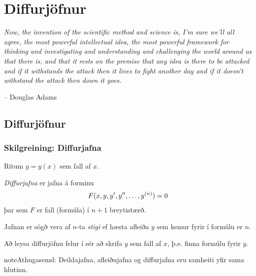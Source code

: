 \documentclass[b5paper,10pt,icelandic]{sphinxmanual}
\begin{document}
\chapter{Diffurjöfnur}
\label{kafli08:diffurjofnur}\label{kafli08::doc}
\emph{Now, the invention of the scientific method and science is, I'm sure
we'll all agree, the most powerful intellectual idea, the most powerful
framework for thinking and investigating and understanding and challenging
the world around us that there is, and that it rests on the premise that
any idea is there to be attacked and if it withstands the attack then it
lives to fight another day and if it doesn't withstand the attack then
down it goes.}

-- Douglas Adams


\section{Diffurjöfnur}
\label{kafli08:id1}\label{kafli08:index-0}

\subsection{Skilgreining: Diffurjafna}
\label{kafli08:skilgreining-diffurjafna}\label{kafli08:diffurjafna}
Ritum \(y=y(x)\) sem fall af \(x\).

\textit{Diffurjafna} er jafna á forminu
\begin{gather}
\begin{split}F(x, y, y', y'', \ldots, y^{(n)})=0\end{split}\notag
\end{gather}
þar sem \(F\) er fall (formúla) í \(n+1\) breytistærð.

Jafnan er sögð vera af \(n\)-ta \emph{stigi} ef hæsta afleiða \(y\)
sem kemur fyrir í formúlu er \(n\).

Að leysa diffurjöfnu felur í sér að skrifa \(y\) sem fall
af \(x\), þ.e. finna formúlu fyrir \(y\).

\begin{notice}{note}{Athugasemd:}
Deildajafna, afleiðujafna og diffurjafna eru samheiti yfir
sama hlutinn.
\end{notice}
\end{document}
